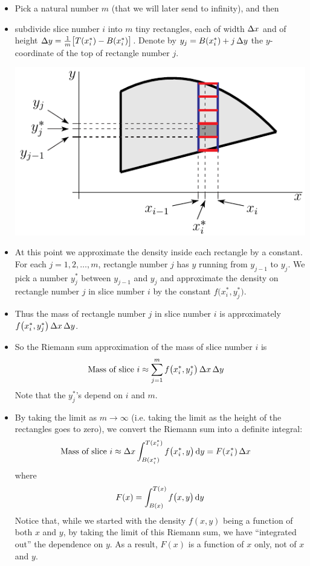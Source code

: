 \begin{itemize}
\item 
Pick a natural number $m$ (that we will later send to infinity), and then 
\item 
subdivide slice number $i$ into $m$ tiny rectangles, each of width $\Delta x$ 
and of height $\Delta y=\frac{1}{m}\big[T(x_i^*)-B(x_i^*)\big]$. Denote by 
$y_j = B(x_i^*) + j\,\Delta y$ the $y$-coordinate 
of the top of rectangle number $j$.
\begin{efig}
\begin{center}
   \includegraphics{vSliceD.pdf}
\end{center}
\end{efig}
\item 
At this point we approximate the density inside each rectangle by a constant.
For each $j=1,2,\dots,m$, rectangle number $j$ has $y$ running from $y_{j-1}$ 
to $y_j$.  We pick a number $y_j^*$ between $y_{j-1}$ and $y_j$ and 
approximate the density on rectangle number $j$ in slice number $i$
by the constant $f\big(x_i^*,y_j^*\big)$.
\item 
Thus the mass of rectangle number $j$ in slice number $i$ is approximately $f\big(x_i^*,y_j^*\big)\,\Delta x\,\Delta y$.
\item 
So the Riemann sum approximation of the mass of slice number $i$ is
\begin{align*}
  \text{Mass of slice $i$} 
          &\approx \sum_{j=1}^m  f\big(x_i^*,y_j^*\big)\,\Delta x\,\Delta y
\end{align*}
Note that the $y_j^*$'s depend on $i$ and $m$.
\item 
By taking the limit as $m \to \infty$ (i.e. taking the limit as the height 
of the rectangles goes to zero), we convert the Riemann sum into a definite integral:
\begin{align*}
  \text{Mass of slice $i$} 
          &\approx \Delta x \int_{B(x_i^*)}^{T(x_i^*)} f\big(x_i^*,y\big)\,\mathrm{d}y
          = F(x_i^*)\,\Delta x
\end{align*}
where
\begin{equation*}
F(x) = \int_{B(x)}^{T(x)} f\big(x,y\big)\,\mathrm{d}y
\end{equation*}
Notice that, while we started with the density $f(x,y)$ being a function of 
both $x$ and $y$, by taking the limit of this Riemann sum,
we have ``integrated out'' the dependence on $y$. 
As a result, $F(x)$ is a function of $x$ only, not of $x$ and $y$.


\end{itemize}
